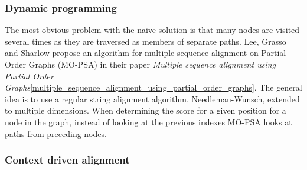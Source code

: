 \documentclass[thesis.tex]{subfiles}
\begin{document}
\subsubsection{Dynamic programming}
The most obvious problem with the naive solution is that many nodes are visited several times as they are traversed as members of separate paths. Lee, Grasso and Sharlow propose an algorithm for multiple sequence alignment on Partial Order Graphs (MO-PSA) in their paper \textit{Multiple sequence alignment using Partial Order Graphs}\ref{multiple_sequence_alignment_using_partial_order_graphs}. The general idea is to use a regular string alignment algorithm, Needleman-Wunsch, extended to multiple dimensions. When determining the score for a given position for a node in the graph, instead of looking at the previous indexes MO-PSA looks at paths from preceding nodes. 
\subsubsection{Context driven alignment}
\end{document}
